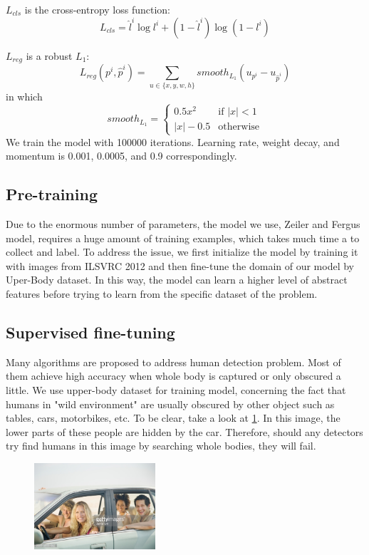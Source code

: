 \documentclass[conference]{IEEEtran}
\begin{document}
$L_{cls}$ is the cross-entropy loss function:
\begin{equation}
L_{cls} = \hat{l}^i \log{l^i} + (1-\hat{l}^i) \log(1-l^i)
\end{equation}

$L_{reg}$ is a robust $L_1$\cite{fastRCNN}:
\begin{equation}
L_{reg}(p^i, \hat{p}^i) = \sum_{u \in \{x, y, w, h\}} smooth_{L_1}(u_{p^i} - u_{\hat{p}^i})
\end{equation}
in which
\begin{equation}
smooth_{L_1} = 
\begin{cases}
0.5x^2 & \text{if } |x| < 1\\
|x| - 0.5 & \text{otherwise}
\end{cases}
\end{equation}
We train the model with 100000 iterations. Learning rate, weight decay, and momentum is 0.001, 0.0005, and 0.9 correspondingly.
\subsection{Pre-training}
Due to the enormous number of parameters, the model we use, Zeiler and Fergus model, requires a huge amount of training examples, which takes much time a to collect and label. To address the issue, we first initialize the model by training it with images from ILSVRC 2012 and then fine-tune the domain of our model by Uper-Body dataset. In this way, the model can learn a higher level of abstract features before trying to learn from the specific dataset of the problem. %
\subsection{Supervised fine-tuning}
Many algorithms are proposed to address human detection problem. Most of them achieve high accuracy when whole body is captured or only obscured a little. We use upper-body dataset for training model, concerning the fact that humans in "wild environment" are usually obscured by other object such as tables, cars, motorbikes, etc. To be clear, take a look at \ref{fig:h_exp1}. In this image, the lower parts of these people are hidden by the car. Therefore, should any detectors try find humans in this image by searching whole bodies, they will fail.
\begin{figure}
	\centering
	\includegraphics[width = 0.4\textwidth]{img7}
	\caption{}
	\label{fig:h_exp1}
\end{figure}
\end{document}
